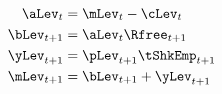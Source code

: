   \begin{equation}\begin{gathered}\begin{aligned}
    {\aLev}_{t}  & = \mLev_{t}-\cLev_{t} \label{DBCLevelStart}
    \\  {\bLev}_{t+1}  & = {\aLev}_{t} \Rfree_{t+1}
    \\  {\yLev}_{t+1}  & = \pLev_{t+1}\tShkEmp_{t+1}
    \\  {\mLev}_{t+1}  & = {\bLev}_{t+1} + {\yLev}_{t+1} \label{eq:budconstr} \label{DBCLevelEnd}
  \end{aligned}\end{gathered}\end{equation}
